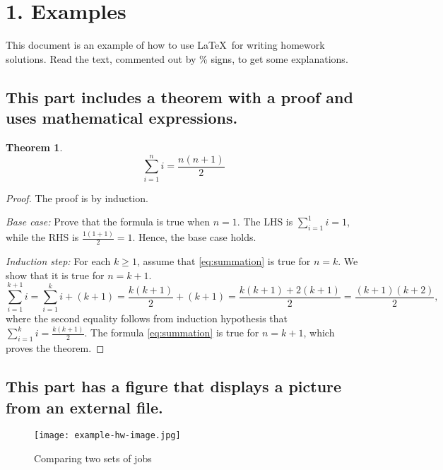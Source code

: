 \documentclass[11pt]{332homework}
\author{Alice P. Hacker}
\newtheorem{theorem}{Theorem}
\begin{document}
\section*{1. Examples}
This document is an example of how to use \LaTeX\ for writing homework solutions. Read the text, commented out by \% signs, to get some explanations.

\subsection{This part includes a theorem with a proof and uses mathematical expressions.}
\begin{theorem}
\begin{equation}
  \sum_{i=1}^n i = \frac{n(n+1)}{2}
  \label{eq:summation}
\end{equation}
\end{theorem}
\begin{proof} The proof is by induction.

\noindent\textsl{Base case:} Prove that the formula is true when $n=1$.
The LHS is $\sum_{i=1}^1 i=1$, while the RHS is
$\frac{1(1+1)}{2} = 1$. Hence, the base case holds.

\noindent\textsl{Induction step:} For each $k\geq 1$, assume that \eqref{eq:summation} is true for $n=k$. We show that it is true
for $n=k+1$.
\begin{equation*}
  \sum_{i=1}^{k+1} i = \sum_{i=1}^k i + (k+1) =
  \frac{k(k+1)}{2} + (k+1) =
  \frac{k(k+1) + 2(k+1)}{2} = \frac{(k+1)(k+2)}{2},
\end{equation*}
where the second equality follows from induction hypothesis that
$\sum_{i=1}^k i = \frac{k(k+1)}{2}$.
The formula \eqref{eq:summation} is true for $n=k+1$, which proves the
theorem.
\end{proof}

\subsection{This part has a figure that displays a picture from an external file.}
\begin{figure}[h]
  \centering
  \texttt{[image: example-hw-image.jpg]}
 \caption{Comparing two sets of jobs}
\end{figure}
\end{document}
